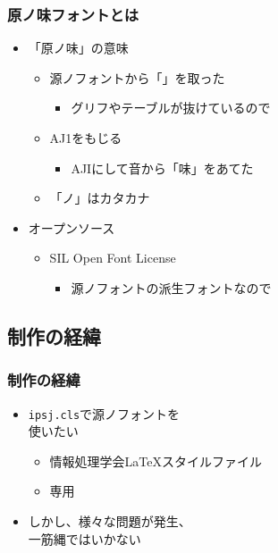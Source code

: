 \begin{frame}\frametitle{原ノ味フォントとは}
  \begin{itemize}
  \item 「原ノ味」の意味
    \begin{itemize}
    \item 源ノフォントから「」を取った
      \begin{itemize}
      \item グリフやテーブルが抜けているので
      \end{itemize}
    \item AJ1をもじる
      \begin{itemize}
      \item AJIにして音から「味」をあてた
      \end{itemize}
    \item 「ノ」はカタカナ
    \end{itemize}
  \item オープンソース
    \begin{itemize}
    \item SIL Open Font License
      \begin{itemize}
      \item 源ノフォントの派生フォントなので
      \end{itemize}
    \end{itemize}
  \end{itemize}
\end{frame}

\subsection{制作の経緯}
\begin{frame}\frametitle{制作の経緯}
  \begin{itemize}
  \item \texttt{ipsj.cls}で源ノフォントを \\
    使いたい
    \begin{itemize}
    \item 情報処理学会\LaTeX スタイルファイル
    \item \pLaTeX 専用
    \end{itemize}
  \item しかし、様々な問題が発生、 \\
    一筋縄ではいかない
  \end{itemize}
\end{frame}

